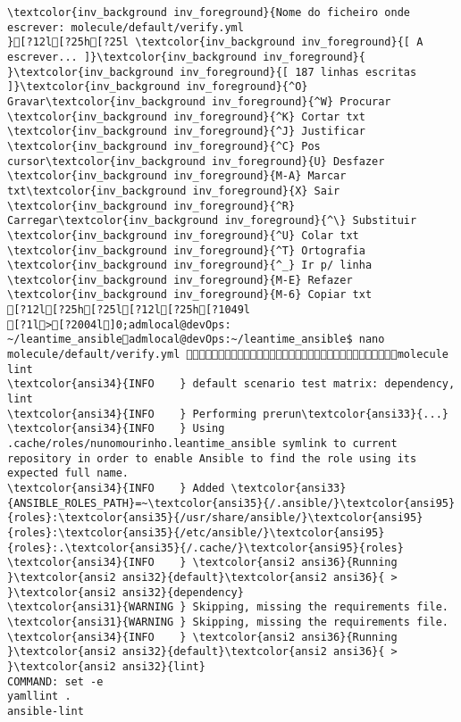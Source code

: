 \documentclass{scrartcl}
\begin{document}
\begin{Verbatim}
\textcolor{inv_background inv_foreground}{Nome do ficheiro onde escrever: molecule/default/verify.yml                                                                               }[?12l[?25h[?25l \textcolor{inv_background inv_foreground}{[ A escrever... ]}\textcolor{inv_background inv_foreground}{          }\textcolor{inv_background inv_foreground}{[ 187 linhas escritas ]}\textcolor{inv_background inv_foreground}{^O} Gravar\textcolor{inv_background inv_foreground}{^W} Procurar      \textcolor{inv_background inv_foreground}{^K} Cortar txt    \textcolor{inv_background inv_foreground}{^J} Justificar    \textcolor{inv_background inv_foreground}{^C} Pos cursor\textcolor{inv_background inv_foreground}{U} Desfazer     \textcolor{inv_background inv_foreground}{M-A} Marcar txt\textcolor{inv_background inv_foreground}{X} Sair    \textcolor{inv_background inv_foreground}{^R} Carregar\textcolor{inv_background inv_foreground}{^\} Substituir    \textcolor{inv_background inv_foreground}{^U} Colar txt     \textcolor{inv_background inv_foreground}{^T} Ortografia    \textcolor{inv_background inv_foreground}{^_} Ir p/ linha   \textcolor{inv_background inv_foreground}{M-E} Refazer      \textcolor{inv_background inv_foreground}{M-6} Copiar txt
[?12l[?25h[?25l[?12l[?25h[?1049l
[?1l>[?2004l]0;admlocal@devOps: ~/leantime_ansibleadmlocal@devOps:~/leantime_ansible$ nano molecule/default/verify.yml molecule lint
\textcolor{ansi34}{INFO    } default scenario test matrix: dependency, lint
\textcolor{ansi34}{INFO    } Performing prerun\textcolor{ansi33}{...}
\textcolor{ansi34}{INFO    } Using .cache/roles/nunomourinho.leantime_ansible symlink to current repository in order to enable Ansible to find the role using its expected full name.
\textcolor{ansi34}{INFO    } Added \textcolor{ansi33}{ANSIBLE_ROLES_PATH}=~\textcolor{ansi35}{/.ansible/}\textcolor{ansi95}{roles}:\textcolor{ansi35}{/usr/share/ansible/}\textcolor{ansi95}{roles}:\textcolor{ansi35}{/etc/ansible/}\textcolor{ansi95}{roles}:.\textcolor{ansi35}{/.cache/}\textcolor{ansi95}{roles}
\textcolor{ansi34}{INFO    } \textcolor{ansi2 ansi36}{Running }\textcolor{ansi2 ansi32}{default}\textcolor{ansi2 ansi36}{ > }\textcolor{ansi2 ansi32}{dependency}
\textcolor{ansi31}{WARNING } Skipping, missing the requirements file.
\textcolor{ansi31}{WARNING } Skipping, missing the requirements file.
\textcolor{ansi34}{INFO    } \textcolor{ansi2 ansi36}{Running }\textcolor{ansi2 ansi32}{default}\textcolor{ansi2 ansi36}{ > }\textcolor{ansi2 ansi32}{lint}
COMMAND: set -e
yamllint .
ansible-lint


\end{Verbatim}
\end{document}
